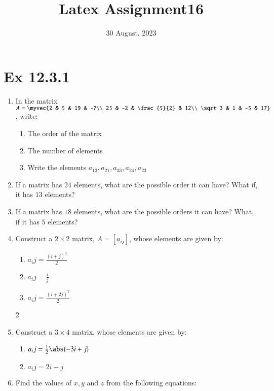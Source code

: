 \documentclass{article}
\theoremstyle{remark}
\begin{document}
\title{Latex Assignment16}
\date{30 August, 2023}
\maketitle
\section*{Ex 12.3.1}
\begin{enumerate}
\item In the matrix $A=\myvec
{2 & 5 & 19 & -7\\
25 & -2 & \frac{5}{2} & 12\\
\sqrt 3 & 1 & -5 & 17}$, write:
\begin{enumerate}[label=(\roman*)]
\item The order of the matrix
\item The number of elements
\item Write the elements $a_{13}, a_{21}, a_{33}, a_{24}, a_{23}$
\end{enumerate}
\item If a matrix has $24$ elements, what are the possible order it can have? What if, it has $13$ elements?
\item If a matrix has $18$ elements, what are the possible orders it can have? What, if it has $5$ elements?
\item Construct a $2\times 2$ matrix, $A=[a_{ij}]$, whose elements are given by:
\begin{enumerate}[label=(\roman*)]
\item $a_ij=\frac{(i+j)^2}{2}$
\item $a_ij=\frac{i}{j}$
\item $a_ij=\frac{(i+2j)^2}{2}$
\end{enumerate}
2\item Construct a $3\times 4$ matrix, whose elements are given by:
\begin{enumerate}[label=(\roman*)]
\item $a_ij=\frac{1}{2}\abs{-3i+j}$
\item $a_ij=2i-j$
\end{enumerate}
\item Find the values of $x, y$ and $z$ from the following equations:
\end{enumerate}
\end{document}

